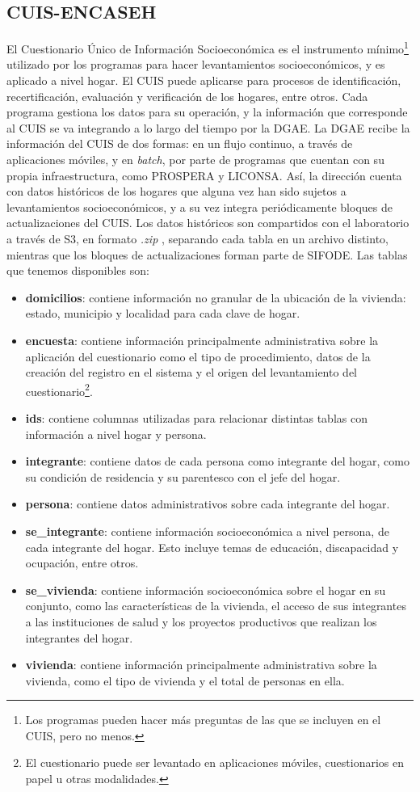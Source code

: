 \subsection*{CUIS-ENCASEH}
El Cuestionario Único de Información Socioeconómica es el instrumento mínimo\footnote{Los programas pueden hacer más preguntas de las que se incluyen en el CUIS, pero no menos.} utilizado por los programas para hacer levantamientos socioeconómicos, y es aplicado a nivel hogar. El CUIS puede aplicarse para procesos de identificación, recertificación, evaluación y verificación de los hogares, entre otros. Cada programa gestiona los datos para su operación, y la información que corresponde al CUIS se va integrando a lo largo del tiempo por la DGAE. La DGAE recibe la información del CUIS de dos formas: en un flujo continuo, a través de aplicaciones móviles, y en \textit{batch}, por parte de programas que cuentan con su propia infraestructura, como PROSPERA y LICONSA. Así, la dirección cuenta con datos históricos de los hogares que alguna vez han sido sujetos a levantamientos socioeconómicos, y a su vez integra periódicamente bloques de actualizaciones del CUIS. Los datos históricos son compartidos con el laboratorio a través de S3, en formato \textit{.zip} , separando cada tabla en un archivo distinto, mientras que los bloques de actualizaciones forman parte de SIFODE. Las tablas que tenemos disponibles son:
\begin{itemize}
    \item \textbf{domicilios}: contiene información no granular de la ubicación de la vivienda: estado, municipio y localidad para cada clave de hogar.
    \item \textbf{encuesta}: contiene información principalmente administrativa sobre la aplicación del cuestionario como el tipo de procedimiento, datos de la creación del registro en el sistema y el origen del levantamiento del cuestionario\footnote{El cuestionario puede ser levantado en aplicaciones móviles, cuestionarios en papel u otras modalidades.}.
    \item \textbf{ids}: contiene columnas utilizadas para relacionar distintas tablas con información a nivel hogar y persona.
    \item \textbf{integrante}: contiene datos de cada persona como integrante del hogar, como su condición de residencia y su parentesco con el jefe del hogar.
    \item \textbf{persona}: contiene datos administrativos sobre cada integrante del hogar.
    \item \textbf{se\_integrante}: contiene información socioeconómica a nivel persona, de cada integrante del hogar. Esto incluye temas de educación, discapacidad y ocupación, entre otros.
    \item \textbf{se\_vivienda}: contiene información socioeconómica sobre el hogar en su conjunto, como las características de la vivienda, el acceso de sus integrantes a las instituciones de salud y los proyectos productivos que realizan los integrantes del hogar.
    \item \textbf{vivienda}: contiene información principalmente administrativa sobre la vivienda, como el tipo de vivienda y el total de personas en ella.
\end{itemize}
